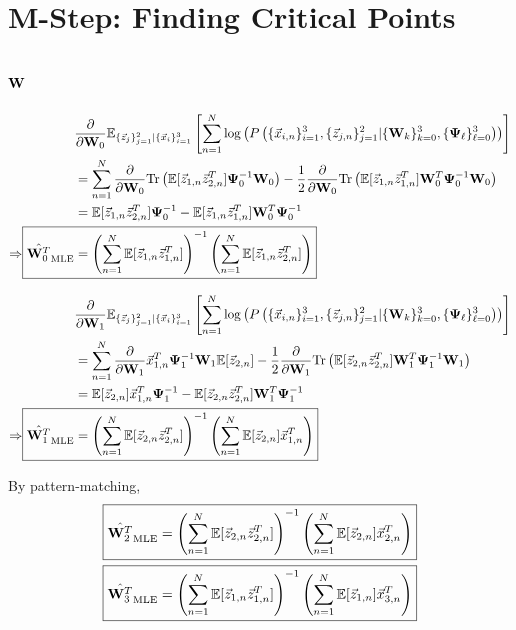 \section{M-Step: Finding Critical Points}
\subsection{$\bold{W}$}

\begin{align*}
  &\frac{  \partial }{\partial \W_0} \ecll \\
  &=  \sum_{n=1}^N \frac{\partial}{\partial \W_0} \Tr \left(\ev [\z_{1,n} \z_{2,n}^T]
      \bpsi_0^{-1} \W_0 \right) - \frac{1}{2} \frac{\partial}{\partial
      \W_0 }\Tr \left( \ev [ \z_{1,n}
    \z_{1,n}^T] \W_0^T \bpsi_0^{-1} \W_0 \right) \\
  &=  \ev [\z_{1,n} \z_{2,n}^T] \bpsi_0^{-1} - \ev [\z_{1,n} \z_{1,n}^T] \W_0^T
    \bpsi_0^{-1}\\
   \Rightarrow \Aboxed{ \hat{\W_0^T}_{\text{MLE}} &= \left(
                                                    \sum_{n=1}^N \ev [\z_{1,n} \z_{1,n}^T]
      \right)^{-1} \left( \sum_{n=1}^N \ev [\z_{1,n} \z_{2,n}^T] \right)}\\
\end{align*}

\begin{align*}
  &\frac{\partial} {\partial \W_1} \ecll \\
  &= \sum_{n=1}^N \frac{\partial}{\partial \W_1} \x_{1,n}^T \bpsi_1^{-1} \W_1 \ev
    [\z_{2,n}] - \frac{1}{2} \frac{\partial}{\partial \W_1} \Tr \left( \ev
    [\z_{2,n} \z_{2,n}^T] \W_1^T \bpsi_1^{-1} \W_1 \right)\\
  &= \ev[\z_{2,n}] \x_{1,n}^T \bpsi_1^{-1} - \ev [ \z_{2,n} \z_{2,n}^T] \W_1^T
    \bpsi_1^{-1} \\
    \Rightarrow \Aboxed{ \hat{ \W_1^T }_{\text{MLE}} &= \left(
                                                       \sum_{n=1}^N
                                                       \ev [ \z_{2,n}
                                                       \z_{2,n}^T]
                                                       \right)^{-1}
                                                       \left(
                                                       \sum_{n=1}^N \ev [ \z_{2,n}]
      \x_{1,n}^T  \right)}
\end{align*}

By pattern-matching,
\begin{align*}
\Aboxed{  \hat{\W_2^T}_{\text{MLE}} &= \left( \sum_{n=1}^N \ev [ \z_{2,n} \z_{2,n}^T] \right)^{-1}
                              \left( \sum_{n=1}^N \ev [ \z_{2,n}]
                                      \x_{2,n}^T  \right)}\\
\Aboxed{    \hat{\W_3^T}_{\text{MLE}} &= \left( \sum_{n=1}^N \ev [ \z_{1,n} \z_{1,n}^T] \right)^{-1}
                              \left( \sum_{n=1}^N \ev [ \z_{1,n}] \x_{3,n}^T \right)}\\  
\end{align*}


